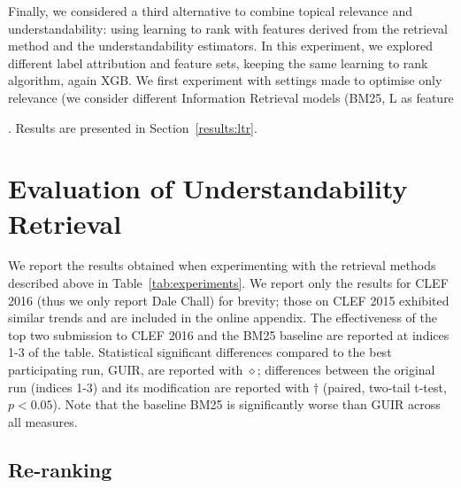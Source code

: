Finally, we considered a third alternative to combine topical relevance and understandability: using learning to rank with features derived from the retrieval method and the understandability estimators.
In this experiment, we explored different label attribution and feature sets, keeping the same learning to rank algorithm, again XGB. We first experiment with settings made to optimise only relevance (we consider different Information Retrieval models (BM25, L as feature

. Results are presented in Section~\ref{results:ltr}.

\section{Evaluation of Understandability Retrieval}
We report the results obtained when experimenting with the retrieval methods described above in Table~\ref{tab:experiments}. We report only the results for CLEF 2016 (thus we only report Dale Chall) for brevity; those on CLEF 2015 exhibited similar trends and are included in the online appendix. The effectiveness of the top two submission to CLEF 2016 and the BM25 baseline are reported at indices 1-3 of the table. Statistical significant differences compared to the best participating run, GUIR, are reported with $\diamond$; differences between the original run (indices 1-3) and its modification are reported with $\dagger$ (paired, two-tail t-test, $p<0.05$). Note that the baseline BM25 is significantly worse than GUIR across all measures.  


\subsection{Re-ranking}
\label{results:reranking}

